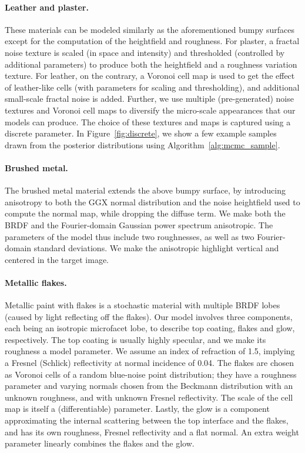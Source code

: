 \paragraph*{Leather and plaster.}
These materials can be modeled similarly as the aforementioned bumpy surfaces except for the computation of the heightfield and roughness.
For plaster, a fractal noise texture is scaled (in space and intensity) and thresholded (controlled by additional parameters) to produce both the heightfield and a roughness variation texture. For leather, on the contrary, a Voronoi cell map is used to get the effect of leather-like cells (with parameters for scaling and thresholding), and additional small-scale fractal noise is added.
Further, we use multiple (pre-generated) noise textures and Voronoi cell maps to diversify the micro-scale appearances that our models can produce.
The choice of these textures and maps is captured using a discrete parameter.
In Figure~\ref{fig:discrete}, we show a few example samples drawn from the posterior distributions using Algorithm~\ref{alg:mcmc_sample}.

\paragraph*{Brushed metal.} The brushed metal material extends the above bumpy surface, by introducing anisotropy to both the GGX normal distribution and the noise heightfield used to compute the normal map, while dropping the diffuse term. We make both the BRDF and the Fourier-domain Gaussian power spectrum anisotropic. The parameters of the model thus include two roughnesses, as well as two Fourier-domain standard deviations.  We make the anisotropic highlight vertical and centered in the target image.

\paragraph*{Metallic flakes.} Metallic paint with flakes is a stochastic material with multiple BRDF lobes (caused by light reflecting off the flakes). Our model involves three components, each being an isotropic microfacet lobe, to describe top coating, flakes and glow, respectively. The top coating is usually highly specular, and we make its roughness a model parameter. We assume an index of refraction of 1.5, implying a Fresnel (Schlick) reflectivity at normal incidence of 0.04. The flakes are chosen as Voronoi cells of a random blue-noise point distribution; they have a roughness parameter and varying normals chosen from the Beckmann distribution with an unknown roughness, and with unknown Fresnel reflectivity. The scale of the cell map is itself a (differentiable) parameter. Lastly, the glow is a component approximating the internal scattering between the top interface and the flakes, and has its own roughness, Fresnel reflectivity and a flat normal. An extra weight parameter linearly combines the flakes and the glow.

